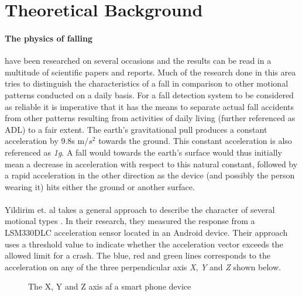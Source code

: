 \documentclass[12pt, a4paper, onecolumn]{article}
\begin{document}
\section{Theoretical Background}
	
	\paragraph{The physics of falling} have been researched on several occasions and the results can be read in a multitude of scientific papers and reports. Much of the research done in this area tries to distinguish the characteristics of a fall in comparison to other motional patterns conducted on a daily basis. For a fall detection system to be considered as reliable it is imperative that it has the means to separate actual fall accidents from other patterns resulting from activities of daily living (further referenced as ADL) to a fair extent. The earth's gravitational pull produces a constant acceleration by 9.8s m/$s^{2}$ towards the ground. This constant acceleration is also referenced as \textit{1g}. A fall would towards the earth's surface would thus initially mean a decrease in acceleration with respect to this natural constant, followed by a rapid acceleration in the other direction as the device (and possibly the person wearing it) hits either the ground or another surface.
	

	\paragraph{} Yildirim et. al takes a general approach to describe the character of several motional types \cite{int_journ}. In their research, they measured the response from a LSM330DLC acceleration sensor located in an Android device. Their approach uses a threshold value to indicate whether the acceleration vector exceeds the allowed limit for a crash. The blue, red and green lines corresponds to the acceleration on any of the three perpendicular axis \textit{X}, \textit{Y} and \textit{Z} shown below.
	
		\begin{figure}[h]
			\centering
			\caption{The X, Y and Z axis af a smart phone device}%
			\label{fig:example}%
		\end{figure}
	
\end{document}

